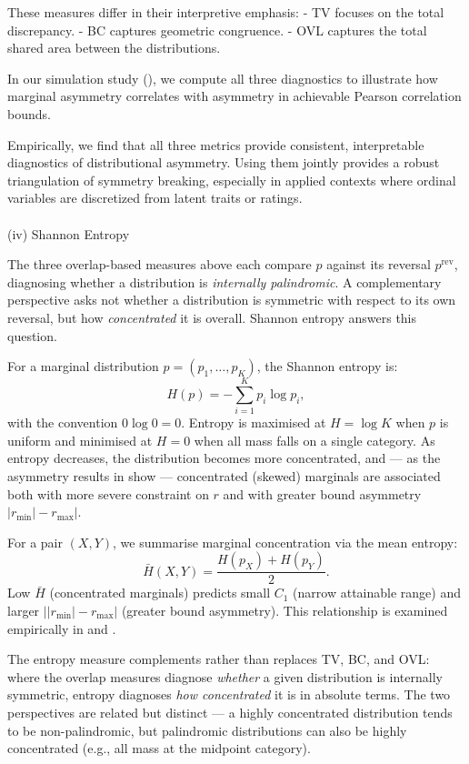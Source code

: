 \documentclass[
  12pt,
]{article}
\makeatletter
\let\oldparagraph\paragraph
\renewcommand{\paragraph}{
    \@ifstar
      \xxxParagraphStar
      \xxxParagraphNoStar
  }
\newcommand{\xxxParagraphStar}[1]{\oldparagraph*{#1}\mbox{}}
\newcommand{\xxxParagraphNoStar}[1]{\oldparagraph{#1}\mbox{}}
\theoremstyle{plain}
\theoremstyle{definition}
\theoremstyle{remark}
\makeatother
\begin{document}
These measures differ in their interpretive emphasis: - TV focuses on
the total discrepancy. - BC captures geometric congruence. - OVL
captures the total shared area between the distributions.

In our simulation study (), we compute all three
diagnostics to illustrate how marginal asymmetry correlates with
asymmetry in achievable Pearson correlation bounds.

Empirically, we find that all three metrics provide consistent,
interpretable diagnostics of distributional asymmetry. Using them
jointly provides a robust triangulation of symmetry breaking, especially
in applied contexts where ordinal variables are discretized from latent
traits or ratings.

\paragraph{(iv) Shannon Entropy}\label{iv-shannon-entropy}

The three overlap-based measures above each compare \(p\) against its
reversal \(p^{\mathrm{rev}}\), diagnosing whether a distribution is
\emph{internally palindromic}. A complementary perspective asks not
whether a distribution is symmetric with respect to its own reversal,
but how \emph{concentrated} it is overall. Shannon entropy answers this
question.

For a marginal distribution \(p = (p_1, \ldots, p_K)\), the Shannon
entropy is: \[
H(p) = -\sum_{i=1}^{K} p_i \log p_i,
\] with the convention \(0 \log 0 = 0\). Entropy is maximised at
\(H = \log K\) when \(p\) is uniform and minimised at \(H = 0\) when all
mass falls on a single category. As entropy decreases, the distribution
becomes more concentrated, and --- as the asymmetry results in
 show --- concentrated (skewed) marginals are
associated both with more severe constraint on \(r\) and with greater
bound asymmetry \(|r_{\min}| - r_{\max}|\).

For a pair \((X, Y)\), we summarise marginal concentration via the mean
entropy: \[
\bar{H}(X,Y) = \frac{H(p_X) + H(p_Y)}{2}.
\] Low \(\bar{H}\) (concentrated marginals) predicts small \(C_1\)
(narrow attainable range) and larger
\(\bigl||r_{\min}| - r_{\max}\bigr|\) (greater bound asymmetry). This
relationship is examined empirically in  and
.

The entropy measure complements rather than replaces TV, BC, and OVL:
where the overlap measures diagnose \emph{whether} a given distribution
is internally symmetric, entropy diagnoses \emph{how concentrated} it is
in absolute terms. The two perspectives are related but distinct --- a
highly concentrated distribution tends to be non-palindromic, but
palindromic distributions can also be highly concentrated (e.g., all
mass at the midpoint category).
\end{document}
